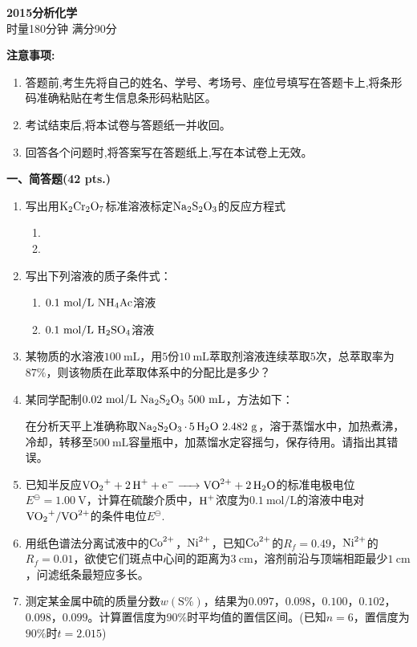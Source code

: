 \begin{center}
    {\LARGE \textbf{2015分析化学}} \\[2ex]
    {\large 时量180分钟 \quad 满分90分}
\end{center}

\vspace{0.5cm}
\noindent\textbf{注意事项:}
\begin{enumerate}[label=\arabic*., parsep=0pt, itemsep=0pt]
    \item 答题前,考生先将自己的姓名、学号、考场号、座位号填写在答题卡上,将条形码准确粘贴在考生信息条形码粘贴区。
    \item 考试结束后,将本试卷与答题纸一并收回。
    \item 回答各个问题时,将答案写在答题纸上,写在本试卷上无效。
\end{enumerate}

\vspace{0.5cm}
\noindent\textbf{一、简答题(42 pts.)}

\begin{enumerate}[label=\arabic*., itemsep=1.5ex]
    \item 写出用$\ce{K2Cr2O7}$标准溶液标定$\ce{Na2S2O3}$的反应方程式
    \begin{enumerate}[label=(\arabic*), noitemsep, topsep=0pt, partopsep=0pt]
        \item 
        \item 
    \end{enumerate}
    \item 写出下列溶液的质子条件式：
    \begin{enumerate}[label=(\arabic*), noitemsep, topsep=0pt, partopsep=0pt]
        \item $0.1\ \mathrm{mol/L}\ \ce{NH4Ac}$溶液
        \item $0.1\ \mathrm{mol/L}\ \ce{H2SO4}$溶液
    \end{enumerate}
    \item 某物质的水溶液$100\ \mathrm{mL}$，用$5$份$10\ \mathrm{mL}$萃取剂溶液连续萃取$5$次，总萃取率为$87\%$，则该物质在此萃取体系中的分配比是多少？
    \item 某同学配制$0.02\ \mathrm{mol/L}\ \ce{Na2S2O3}\ 500\ \mathrm{mL}$，方法如下：
    
    在分析天平上准确称取$\ce{Na2S2O3 * 5H2O}\ 2.482\ \mathrm{g}$，溶于蒸馏水中，加热煮沸，冷却，转移至$500\ \mathrm{mL}$容量瓶中，加蒸馏水定容摇匀，保存待用。请指出其错误。
    \item 已知半反应$\ce{VO2^+ + 2H+ + e^- -> VO^{2+} + 2H2O}$的标准电极电位$E^\ominus=1.00\ \mathrm{V}$，计算在硫酸介质中，$\ce{H+}$浓度为$0.1\ \mathrm{mol/L}$的溶液中电对$\ce{VO2^+/VO^{2+}}$的条件电位$E^{\ominus}$.
    \item 用纸色谱法分离试液中的$\ce{Co^{2+}}$，$\ce{Ni^{2+}}$，已知$\ce{Co^{2+}}$的$R_f=0.49$，$\ce{Ni^{2+}}$的$R_f=0.01$，欲使它们斑点中心间的距离为$3\ \mathrm{cm}$，溶剂前沿与顶端相距最少$1\ \mathrm{cm}$，问滤纸条最短应多长。
    \item 测定某金属中硫的质量分数$w(\mathrm{S}\%)$，结果为$0.097$，$0.098$，$0.100$，$0.102$，$0.098$，$0.099$。计算置信度为$90\%$时平均值的置信区间。(已知$n=6$，置信度为$90\%$时$t=2.015$)
\end{enumerate}

